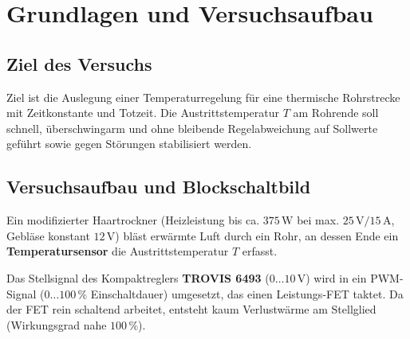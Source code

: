 \documentclass[a4paper,10pt,department=FakEI]{OTHRartcl}
\begin{document}
\vspace{5mm}

\begingroup
\hypersetup{linkcolor=black}
\tableofcontents
\endgroup

\clearpage

\section{Grundlagen und Versuchsaufbau}
\subsection{Ziel des Versuchs}
Ziel ist die Auslegung einer Temperaturregelung für eine thermische Rohrstrecke mit Zeitkonstante und Totzeit. Die Austrittstemperatur $T$ am Rohrende soll schnell, überschwingarm und ohne bleibende Regelabweichung auf Sollwerte geführt sowie gegen Störungen stabilisiert werden.

\subsection{Versuchsaufbau und Blockschaltbild}
Ein modifizierter Haartrockner (Heizleistung bis ca. $375\,\text{W}$ bei max. $25\,\text{V} / 15\,\text{A}$, Gebläse konstant $12\,\text{V}$) bläst erwärmte Luft durch ein Rohr, an dessen Ende ein \textbf{Temperatursensor} die Austrittstemperatur $T$ erfasst.

Das Stellsignal des Kompaktreglers \textbf{TROVIS 6493} ($0\dots 10\,\text{V}$) wird in ein PWM-Signal ($0\dots 100\,\%$ Einschaltdauer) umgesetzt, das einen Leistungs-FET taktet. Da der FET rein schaltend arbeitet, entsteht kaum Verlustwärme am Stellglied (Wirkungsgrad nahe $100\,\%$).
\end{document}
